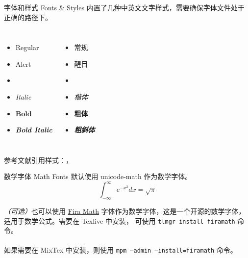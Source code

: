 \documentclass[10pt,aspectratio=169,fontset=none]{ctexbeamer}
\begin{document}
    \begin{frame}{字体和样式 Fonts \& Styles}
        内置了几种中英文文字样式，需要确保字体文件处于正确的路径下。
        \begin{columns}
            \begin{itemize}
                \item Regular
                \item \alert{Alert}
                \item {}
                \item \textit{Italic}
                \item \textbf{Bold}
                \item \textbf{\textit{Bold Italic}}
            \end{itemize}
            \begin{itemize}
                \item 常规
                \item \alert{醒目}
                \item {}
                \item \textit{楷体}
                \item \textbf{粗体}
                \item \textbf{\textit{粗斜体}}
            \end{itemize}
        \end{columns}
        \vspace*{1em}
        参考文献引用样式：\cite{Mosher2013}，\cite{Asgharzadeh2008} 
    \end{frame}

    \begin{frame}{数学字体 Math Fonts}
        默认使用 unicode-math 作为数学字体。
        \begin{equation}
            \int_{-\infty}^{\infty} e^{-x^2} dx = \sqrt{\pi}
        \end{equation}

        {\itshape（可选）}也可以使用 \href{https://github.com/firamath/firamath}{Fira Math} 字体作为数学字体，这是一个开源的数学字体，适用于数学公式。需要在 Texlive 中安装， 可使用 \texttt{\alert{tlmgr} install firamath} 命令。
        \\~\\
        如果需要在 MixTex 中安装，则使用 \texttt{\alert{mpm} --admin --install=firamath} 命令。
    \end{frame}
\end{document}
